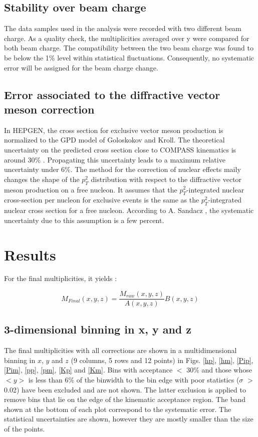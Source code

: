 \documentclass[letterpaper,12pt]{article}
\begin{document}
\subsection{Stability over beam charge}

The data samples used in the analysis were recorded with two different beam charge. As a quality check, the multiplicities averaged over y were compared for both beam charge. The compatibility between the two beam charge was found to be below the 1\% level within statistical fluctuations. Consequently, no systematic error will be assigned for the beam charge change.

\subsection{Error associated to the diffractive vector meson correction}

In HEPGEN, the cross section for exclusive vector meson production is normalized to the GPD model of Goloskokov and Kroll. The theoretical uncertainty on the predicted cross section close to COMPASS kinematics is around 30\% \cite{Goloskokov}. Propagating this uncertainty leads to a maximum relative uncertainty under 6\%.
The method for the correction of nuclear effects maily changes the shape of the $p_T^2$ distribution with respect to the diffractive vector meson production on a free nucleon. It assumes that the $p_T^2$-integrated nuclear cross-section per nucleon for exclusive events is the same as the $p_T^2$-integrated nuclear cross section for a free nucleon. According to A. Sandacz \cite{Hepgen}, the systematic uncertainty due to this assumption is a few percent.

\section{Results} \label{Res}

For the final multiplicities, it yields :

\begin{equation}
	M_{Final}(x,y,z) = \frac{M_{raw}(x,y,z)}{A(x,y,z)}B(x,y,z)
\end{equation}

\subsection{3-dimensional binning in x, y and z}

The final multiplicities with all corrections are shown in a multidimensional binning in $x$, $y$ and $z$ (9 columns, 5 rows and 12 points) in Figs. \ref{hp}, \ref{hm}, \ref{Pip}, \ref{Pim}, \ref{pp}, \ref{pm}, \ref{Kp} and \ref{Km}. Bins with acceptance $<$ 30\% and those whose $<y>$ is less than 6\% of the binwidth to the bin edge with poor statistics ($\sigma$ $>$ 0.02) have been excluded and are not shown. The latter exclusion is applied to remove bins that lie on the edge of the kinematic acceptance region. The band shown at the bottom of each plot correspond to the systematic error. The statistical uncertainties are shown, however they are mostly smaller than the size of the points.
\end{document}
